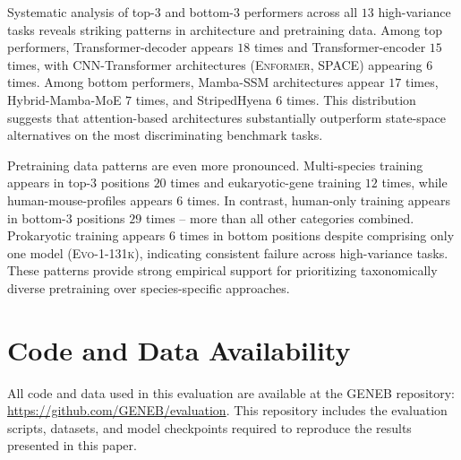 \documentclass{article}
\theoremstyle{plain}
\theoremstyle{definition}
\theoremstyle{remark}
\begin{document}
Systematic analysis of top-3 and bottom-3 performers across all
$13$ high-variance tasks reveals striking patterns in
architecture and pretraining data. Among top performers,
Transformer-decoder appears $18$ times and Transformer-encoder
$15$ times, with CNN-Transformer architectures
(\textsc{Enformer}, \textsc{SPACE}) appearing $6$ times. Among
bottom performers, Mamba-SSM architectures appear $17$ times,
Hybrid-Mamba-MoE $7$ times, and StripedHyena $6$ times. This
distribution suggests that attention-based architectures
substantially outperform state-space alternatives on the most
discriminating benchmark tasks.

Pretraining data patterns are even more pronounced. Multi-species
training appears in top-3 positions $20$ times and
eukaryotic-gene training $12$ times, while human-mouse-profiles
appears $6$ times. In contrast, human-only training appears in
bottom-3 positions $29$ times -- more than all other categories
combined. Prokaryotic training appears $6$ times in bottom
positions despite comprising only one model
(\textsc{Evo-1-131k}), indicating consistent failure across
high-variance tasks. These patterns provide strong empirical
support for prioritizing taxonomically diverse pretraining over
species-specific approaches.

\section*{Code and Data Availability}
All code and data used in this evaluation are available at the GENEB repository: \url{https://github.com/GENEB/evaluation}. This repository includes the evaluation scripts, datasets, and model checkpoints required to reproduce the results presented in this paper.
\end{document}
